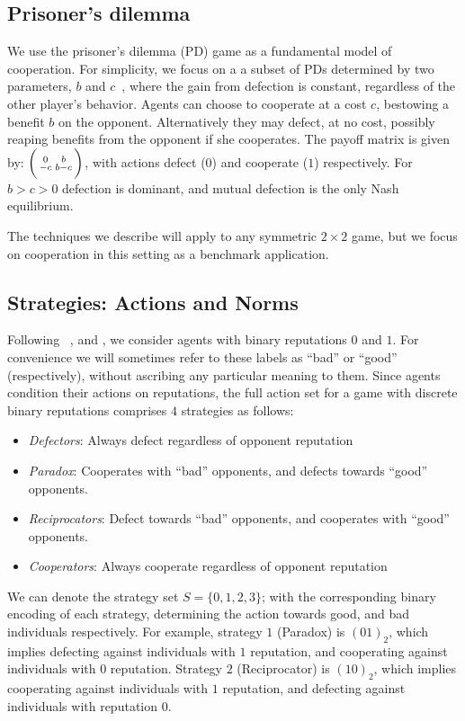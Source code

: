 \documentclass[sigconf]{aamas}  %
\newenvironment{psmallmatrix}
  {\bigg(\begin{smallmatrix}}
  {\end{smallmatrix}\bigg)}
\begin{document}
\subsection{Prisoner's dilemma}
We use the prisoner's dilemma (PD) game as a fundamental model of cooperation. For simplicity, we focus on a a subset of PDs determined by two parameters, $b$ and $c$~\cite{nowak:AAM:1990},  where the gain from defection is constant, regardless of the other player's behavior. Agents can choose to cooperate at a cost $c$, bestowing a benefit $b$ on the opponent. Alternatively they may defect, at no cost, possibly reaping benefits from the opponent if she cooperates. The payoff matrix is given by: $\begin{psmallmatrix}0 & b\\-c & b-c\end{psmallmatrix}$, with actions defect ($0$) and cooperate  ($1$) respectively. For $b> c >0$ defection is dominant, and  mutual defection is the only Nash equilibrium.

The techniques we describe will apply to any symmetric $2 \times 2$ game, but we focus on cooperation in this setting as a benchmark application. 

\subsection{Strategies: Actions and Norms }
\label{actions_norms}
Following ~\cite{Santos2016}, \cite{santos_social_2018} and \cite{santos2018indirect}, we consider agents with binary reputations $0$ and $1$. For convenience we will sometimes refer to these labels as ``bad'' or ``good'' (respectively), without ascribing any particular meaning to them. Since agents condition their actions on reputations, the full action set for a game with discrete binary reputations comprises $4$ strategies as follows:

\begin{itemize}
    \item \emph{Defectors}: Always defect regardless of opponent reputation
    \item \emph{Paradox}: Cooperates with ``bad'' opponents, and defects towards ``good'' opponents.
    \item \emph{Reciprocators}: Defect towards ``bad'' opponents, and cooperates with ``good'' opponents.
    \item \emph{Cooperators}: Always cooperate regardless of opponent reputation
\end{itemize}
We can denote the strategy set $S = \{0, 1, 2, 3\}$; with the corresponding binary encoding of each strategy, determining the action towards good, and bad individuals respectively. For example, strategy $1$ (Paradox) is $({01})_{2}$, which implies defecting against individuals with $1$ reputation, and cooperating against individuals with $0$ reputation. Strategy $2$ (Reciprocator) is $(10)_{2}$, which implies cooperating against individuals with $1$ reputation, and defecting against individuals with reputation $0$. 
\end{document}
